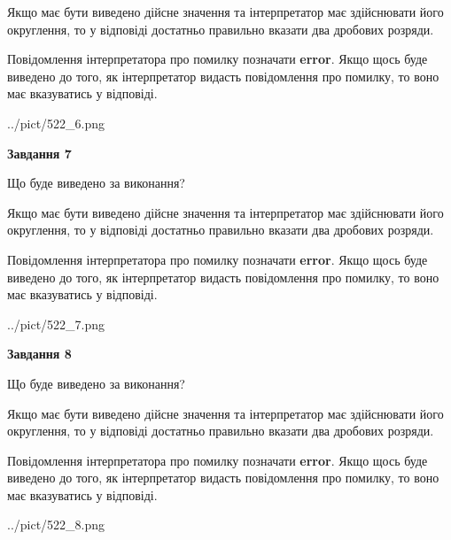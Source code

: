 \documentclass[12pt, ukrainian]{article}
\begin{document}
{\begin {Large}
Якщо має бути виведено дійсне значення та інтерпретатор має здійснювати його округлення, 
то у відповіді достатньо правильно вказати два дробових розряди.

Повідомлення інтерпретатора про помилку позначати \textbf{error}.
Якщо щось буде виведено до того, як інтерпретатор видасть повідомлення про помилку, 
то воно має вказуватись у відповіді. \par

\begin{center}
	{../pict/522_6.png}
\end{center}
\newpage

{\begin {center}\textbf{Завдання 7}\end {center}}\par
Що буде виведено за виконання? \par

Якщо має бути виведено дійсне значення та інтерпретатор має здійснювати його округлення, 
то у відповіді достатньо правильно вказати два дробових розряди.

Повідомлення інтерпретатора про помилку позначати \textbf{error}.
Якщо щось буде виведено до того, як інтерпретатор видасть повідомлення про помилку, 
то воно має вказуватись у відповіді. \par

\begin{center}
	{../pict/522_7.png}
\end{center}
\newpage

{\begin {center}\textbf{Завдання 8}\end {center}}\par
Що буде виведено за виконання? \par

Якщо має бути виведено дійсне значення та інтерпретатор має здійснювати його округлення, 
то у відповіді достатньо правильно вказати два дробових розряди.

Повідомлення інтерпретатора про помилку позначати \textbf{error}.
Якщо щось буде виведено до того, як інтерпретатор видасть повідомлення про помилку, 
то воно має вказуватись у відповіді. \par

\begin{center}
	{../pict/522_8.png}
\end{center}
\newpage


\end{Large}}
\end{document}
